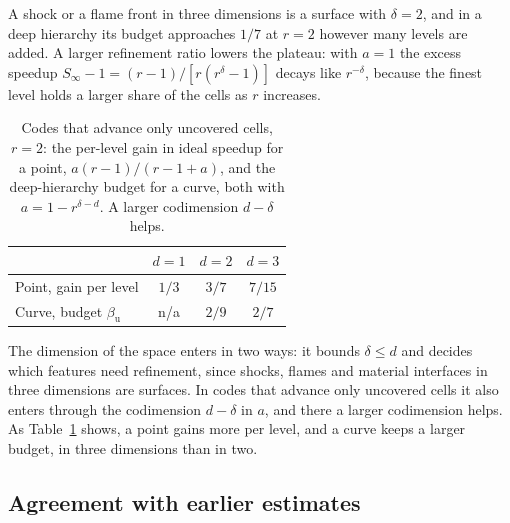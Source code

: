 \documentclass[12pt]{article}
\theoremstyle{remark}
\begin{document}
A shock or a flame front in three dimensions is a surface with $\delta=2$, and in a deep hierarchy its budget approaches $1/7$ at $r=2$ however many levels are added. A larger refinement ratio lowers the plateau: with $a=1$ the excess speedup $S_\infty-1=(r-1)/[r(r^\delta-1)]$ decays like $r^{-\delta}$, because the finest level holds a larger share of the cells as $r$ increases.

\begin{table}[ht]
\centering
\caption{Codes that advance only uncovered cells, $r=2$: the per-level gain in ideal speedup for a point, $a(r-1)/(r-1+a)$, and the deep-hierarchy budget for a curve, both with $a=1-r^{\delta-d}$. A larger codimension $d-\delta$ helps.}
\label{tab:codim}
\begin{tabular}{lccc}
\toprule
 & $d=1$ & $d=2$ & $d=3$\\
\midrule
Point, gain per level & $1/3$ & $3/7$ & $7/15$\\
Curve, budget $\beta_{\mathrm{u}}$ & n/a & $2/9$ & $2/7$\\
\bottomrule
\end{tabular}
\end{table}

The dimension of the space enters in two ways: it bounds $\delta\le d$ and decides which features need refinement, since shocks, flames and material interfaces in three dimensions are surfaces. In codes that advance only uncovered cells it also enters through the codimension $d-\delta$ in $a$, and there a larger codimension helps. As Table~\ref{tab:codim} shows, a point gains more per level, and a curve keeps a larger budget, in three dimensions than in two.

\subsection{Agreement with earlier estimates}\label{sec:earlier}
\end{document}
